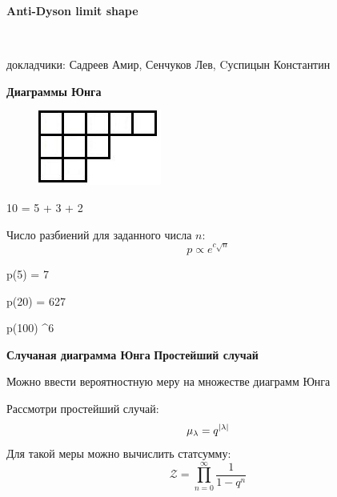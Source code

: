 \documentclass[fullscreen=true, bookmarks=false]{beamer}
\date{}
\begin{document}
\begin{frame}
\begin{center} 
{\LARGE {\bf Anti-Dyson limit shape}}
\end{center}\\

\begin{center}
{\large { докладчики: Садреев Амир, Сенчуков Лев, Cуспицын Константин}}\\

\end{center}
\end{frame}

\begin{frame}
{\bf Диаграммы Юнга}
\begin{figure}
\includegraphics[width=0.4\linewidth]{young_diagram_1.jpg}\\
\end{figure}
\begin{center}
\begin{*equation}
    10 = 5 + 3 + 2
\end{*equation}
\end{center}
Число разбиений для заданного числа $n$:
\begin{equation}
    p \propto  e^{c\sqrt{n}}
\end{equation}
\begin{center}
\begin{*equation}
    p(5) = 7
\end{*equation}
\begin{*equation}
    p(20) = 627
\end{*equation}
\begin{*equation}
    p(100)  ^{6}
\end{*equation}
\end{center}
\end{frame}
\begin{frame}
{\bf Случаная диаграмма Юнга}
{\bf Простейший случай}

Можно ввести вероятностную меру на множестве диаграмм Юнга

Рассмотри простейший случай:
\begin{equation}
    \mu_\lambda = q^{\abs{\lambda}}
\end{equation}
Для такой меры можно вычислить статсумму:
\begin{equation}
    \mathcal{Z} = \prod_{n = 0}^{\infty}\frac{1}{1 - q^{n}}
\end{equation}
\end{frame}
\end{document}
